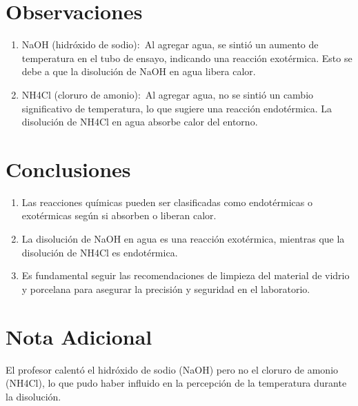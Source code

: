 \documentclass[12pt,a4paper]{report}
\begin{document}
\section*{Observaciones}
\begin{enumerate}[label=$\cdot$,left=1em]

  \item NaOH (hidróxido de sodio): Al agregar agua, se sintió un aumento de temperatura en el tubo de ensayo, indicando una reacción exotérmica. Esto se debe a que la disolución de NaOH en agua libera calor.

  \item NH4Cl (cloruro de amonio): Al agregar agua, no se sintió un cambio significativo de temperatura, lo que sugiere una reacción endotérmica. La disolución de NH4Cl en agua absorbe calor del entorno.

\end{enumerate}

\section*{Conclusiones}

\begin{enumerate}[label=$\cdot$,left=1em]

  \item Las reacciones químicas pueden ser clasificadas como endotérmicas o exotérmicas según si absorben o liberan calor.

  \item La disolución de NaOH en agua es una reacción exotérmica, mientras que la disolución de NH4Cl es endotérmica.

  \item Es fundamental seguir las recomendaciones de limpieza del material de vidrio y porcelana para asegurar la precisión y seguridad en el laboratorio.

\end{enumerate}

\section*{Nota Adicional}

El profesor calentó el hidróxido de sodio (NaOH) pero no el cloruro de amonio (NH4Cl), lo que pudo haber influido en la percepción de la temperatura durante la disolución.
\end{document}
